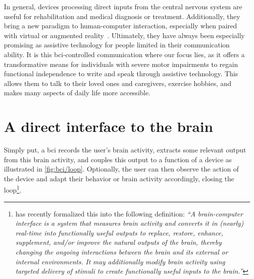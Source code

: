 In general, devices processing direct inputs from the central nervous system are useful
for rehabilitation and medical diagnosis or treatment.
Additionally, they bring a new paradigm to human-computer interaction, especially when
paired with virtual or augmented reality~\cite{SiMohammed2017}.
Ultimately, they have always been especially promising as assistive technology for
people limited in their communication ability.
It is this \ac{bci}-controlled communication where our focus lies, as it offers a
transformative means for individuals with severe motor impairments to regain functional
independence to write and speak through assistive technology.
This allows them to talk to their loved ones and caregivers, exercise hobbies, and makes
many aspects of daily life more accessible.

\section{A direct interface to the brain}

Simply put, a \ac{bci} records the user's brain activity, extracts some relevant output
from this brain activity, and couples this output to a function of a device as
illustrated in \cref{fig:bci/loop}.
Optionally, the user can then observe the action of the device and adapt their behavior
or brain activity accordingly, closing the loop\footnote{\textcite{BCISociety2024} has
recently formalized this into the following definition: \it``A brain-computer interface
is a system that measures brain activity and converts it in (nearly) real-time into
functionally useful outputs to replace, restore, enhance, supplement, and/or improve the
natural outputs of the brain, thereby changing the ongoing interactions between the
brain and its external or internal environments.
It may additionally modify brain activity using targeted delivery of stimuli to create
functionally useful inputs to the brain.''}.

